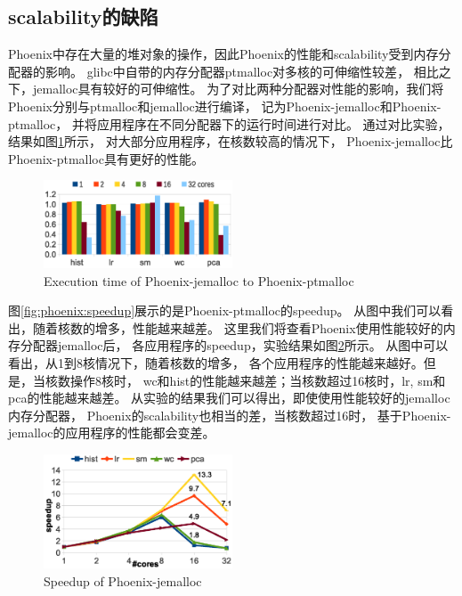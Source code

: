\subsection{scalability的缺陷}
Phoenix中存在大量的堆对象的操作，因此Phoenix的性能和scalability受到内存分配器的影响。
glibc中自带的内存分配器ptmalloc对多核的可伸缩性较差\cite{gloger1997ptmalloc}，
相比之下，jemalloc\cite{evans2006jemalloc}具有较好的可伸缩性。
为了对比两种分配器对性能的影响，我们将Phoenix分别与ptmalloc和jemalloc进行编译，
记为Phoenix-jemalloc和Phoenix-ptmalloc，
并将应用程序在不同分配器下的运行时间进行对比。
通过对比实验，结果如图\ref{fig:phoenix:jemalloc:ptmalloc}所示，
对大部分应用程序，在核数较高的情况下，
Phoenix-jemalloc比Phoenix-ptmalloc具有更好的性能。

\begin{figure}[!h!t]
	\centering
	\includegraphics[width=0.5\textwidth]{eps/phoenix_jemalloc_ptmalloc.eps}
	\caption{Execution time of Phoenix-jemalloc to Phoenix-ptmalloc}
	\label{fig:phoenix:jemalloc:ptmalloc}
\end{figure}

图\ref{fig:phoenix:speedup}展示的是Phoenix-ptmalloc的speedup。
从图中我们可以看出，随着核数的增多，性能越来越差。
这里我们将查看Phoenix使用性能较好的内存分配器jemalloc后，
各应用程序的speedup，实验结果如图\ref{fig:phoenix:speedup:jemalloc}所示。
从图中可以看出，从1到8核情况下，随着核数的增多，
各个应用程序的性能越来越好。但是，当核数操作8核时，
wc和hist的性能越来越差；当核数超过16核时，lr, sm和pca的性能越来越差。
从实验的结果我们可以得出，即使使用性能较好的jemalloc内存分配器，
Phoenix的scalability也相当的差，当核数超过16时，
基于Phoenix-jemalloc的应用程序的性能都会变差。

\begin{figure}[!h!t]
	\centering
	\includegraphics[width=0.5\textwidth]{eps/phoenix_speedup_jemalloc.eps}
	\caption{Speedup of Phoenix-jemalloc}
	\label{fig:phoenix:speedup:jemalloc}
\end{figure}

